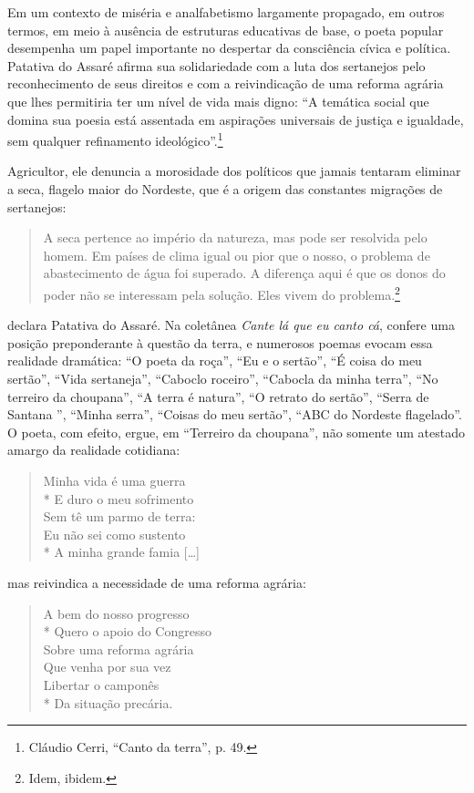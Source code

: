 \noindent Em um contexto de miséria e analfabetismo largamente propagado, em outros termos, em
meio à ausência de estruturas educativas de base, o poeta popular desempenha um
papel importante no despertar da consciência cívica e política. Patativa do
Assaré afirma sua solidariedade com a luta dos sertanejos pelo reconhecimento de
seus direitos e com a reivindicação de uma reforma agrária que lhes permitiria
ter um nível de vida mais digno: “A temática social que domina sua poesia está
assentada em aspirações universais de justiça e igualdade, sem qualquer
refinamento ideológico”.\footnote{ Cláudio Cerri, “Canto da terra”, p. 49.}

Agricultor, ele denuncia a morosidade dos políticos que jamais tentaram eliminar
a seca, flagelo maior do Nordeste, que é a origem das constantes migrações de
sertanejos:

\begin{quote}
A seca pertence ao império da natureza, mas pode ser resolvida pelo
homem. Em países de clima igual ou pior que o nosso, o problema de abastecimento
de água foi superado. A diferença aqui é que os donos do poder não se interessam
pela solução. Eles vivem do problema.\footnote{ Idem, ibidem.}
\end{quote}

\noindent declara Patativa do Assaré. Na coletânea \textit{Cante lá que eu canto cá}, confere uma posição
preponderante à questão da terra, e numerosos poemas evocam essa realidade
dramática: “O poeta da roça”, “Eu e o sertão”, “É coisa do meu sertão”, “Vida
sertaneja”, “Caboclo roceiro”, “Cabocla da minha terra”, “No terreiro da
choupana”, “A terra é natura”, “O retrato do sertão”, “Serra de Santana ”,
“Minha serra”, “Coisas do meu sertão”, “ABC do Nordeste flagelado”. O poeta, com
efeito, ergue, em “Terreiro da choupana”, não somente um atestado amargo da
realidade cotidiana:

\begin{verse}
Minha vida é uma guerra\\*
E duro o meu sofrimento\\
Sem tê um parmo de terra:\\
Eu não sei como sustento\\*
A minha grande famia [\ldots{}]
\end{verse}

\noindent mas reivindica a necessidade de uma reforma agrária:

\begin{verse}
A bem do nosso progresso\\*
Quero o apoio do Congresso\\
Sobre uma reforma agrária\\
Que venha por sua vez\\
Libertar o camponês\\*
Da situação precária.
\end{verse}


